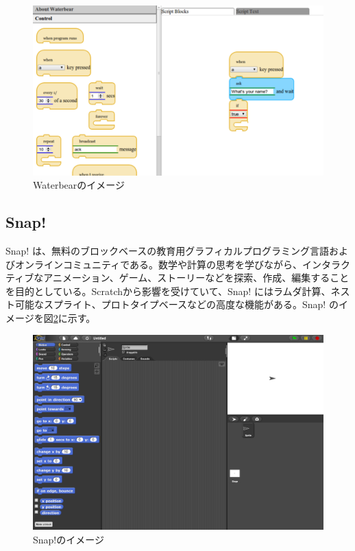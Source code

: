 \documentclass{risepaper}
\begin{document}
\begin{figure}[h]
\begin{center}
\includegraphics[scale=0.5]{img/waterbear.png}
\caption{Waterbearのイメージ}%
\label{fig:waterbear}
\end{center}%
\end{figure}%

	\subsection{Snap!}

Snap! は、無料のブロックベースの教育用グラフィカルプログラミング言語およびオンラインコミュニティである。数学や計算の思考を学びながら、インタラクティブなアニメーション、ゲーム、ストーリーなどを探索、作成、編集することを目的としている。Scratchから影響を受けていて、Snap! にはラムダ計算、ネスト可能なスプライト、プロトタイプベースなどの高度な機能がある。Snap! のイメージを図\ref{fig:snap}に示す。 

\begin{figure}[h]
\begin{center}
\includegraphics[scale=0.5]{img/snap.png}
\caption{Snap!のイメージ}%
\label{fig:snap}
\end{center}%
\end{figure}%
\end{document}
